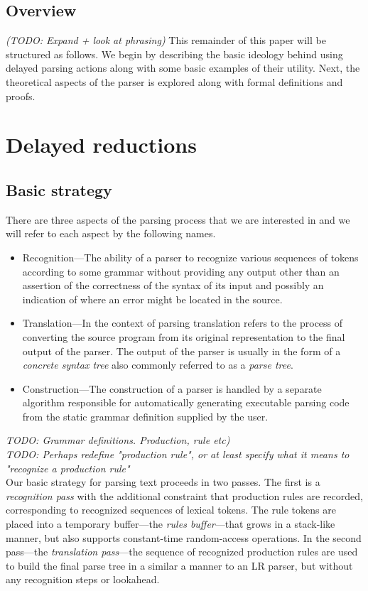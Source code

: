 \documentclass[a4paper,11pt]{article}
\begin{document}
\subsection{Overview}
\emph{(TODO: Expand + look at phrasing)}
This remainder of this paper will be structured as follows. 
We begin by describing the basic ideology behind using delayed parsing actions along with some basic examples of their utility.
Next, the theoretical aspects of the parser is explored along with formal definitions and proofs.


\section{Delayed reductions}

\subsection{Basic strategy}

There are three aspects of the parsing process that we are interested in and we will refer to each aspect by the following names.
\begin{itemize}
\item Recognition---The ability of a parser to recognize various sequences of tokens according to some grammar without providing any output other than an assertion of the correctness of the syntax of its input and possibly an indication of where an error might be located in the source.
\item Translation---In the context of parsing translation refers to the process of converting the source program from its original representation to the final output of the parser. The output of the parser is usually in the form of a \emph{concrete syntax tree} also commonly referred to as a \emph{parse tree}.
\item Construction---The construction of a parser is handled by a separate algorithm responsible for automatically generating executable parsing code from the static grammar definition supplied by the user.
\end{itemize}

\emph{TODO: Grammar definitions. Production, rule etc)}\\
\emph{TODO: Perhaps redefine "production rule", or at least specify what it means to "recognize a production rule"}\\

Our basic strategy for parsing text proceeds in two passes.
The first is a \emph{recognition pass} with the additional constraint that production rules are recorded, corresponding to recognized sequences of lexical tokens. The rule tokens are placed into a temporary buffer---the \emph{rules buffer}---that grows in a stack-like manner, but also supports constant-time random-access operations.
In the second pass---the \emph{translation pass}---the sequence of recognized production rules are used to build the final parse tree in a similar a manner to an LR parser, but without any recognition steps or lookahead.\\
\end{document}
